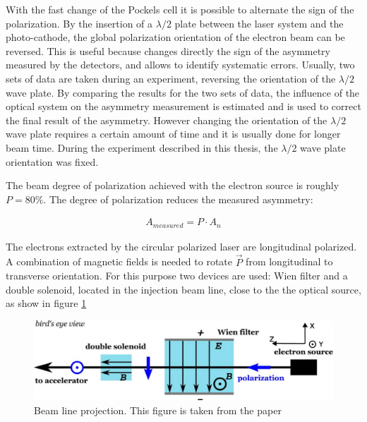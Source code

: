With the fast change of the Pockels cell it is possible to alternate the sign of the polarization. By the insertion of a $\lambda/2$ plate between the laser system and the photo-cathode, the global polarization orientation of the electron beam can be reversed. This is useful because changes directly the sign of the asymmetry measured by the detectors, and allows to identify systematic errors. Usually, two sets of data are taken during an experiment, reversing the orientation of the $\lambda/2$ wave plate. By comparing the results for the two sets of data, the influence of the optical system on the asymmetry measurement is estimated and is used to correct the final result of the asymmetry. However changing the orientation of the $\lambda/2$ wave plate requires a certain amount of time and it is usually done for longer beam time. During the experiment described in this thesis, the $\lambda/2$ wave plate orientation was fixed. 

The beam degree of polarization achieved with the electron source is roughly $P = 80 \% $. The degree of polarization reduces the measured asymmetry:

\begin{align*}
A_{measured} = P \cdot A_{n}
\end{align*}

The electrons extracted by the circular polarized laser are longitudinal polarized. A combination of magnetic fields is needed to rotate $\vec{P}$ from longitudinal to transverse orientation. For this purpose two devices are used: Wien filter and a double solenoid, located in the injection beam line, close to the the optical source, as show in figure \ref{fig:Iniezione}

\begin{figure}[hbtp]
\centering
\includegraphics[width = \textwidth]{ExperimentalSetup/InjectionLine.pdf}
\caption{Beam line projection. This figure is taken from the paper \cite{Schlimme:2016rrp}}
\label{fig:Iniezione}
\end{figure}

